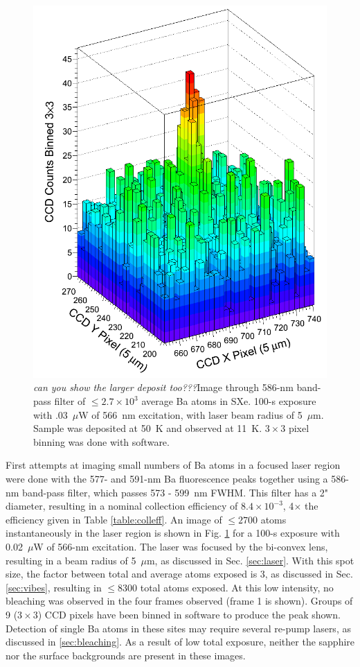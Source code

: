 \begin{figure} %
        \centering
                \includegraphics[width=.6\textwidth]{figures/image_1e4.png}
                \caption{\emph{\color{gray}can you show the larger deposit too???}Image through 586-nm band-pass filter of $\leq 2.7 \times 10^{3}$ average Ba atoms in SXe.  100-s exposure with .03~$\mu$W of 566~nm excitation, with laser beam radius of 5~$\mu$m.  Sample was deposited at 50~K and observed at 11~K.  $3 \times 3$ pixel binning was done with software.}
\label{fig:image590s}
\end{figure}

First attempts at imaging small numbers of Ba atoms in a focused laser region were done with the 577- and 591-nm Ba fluorescence peaks together using a 586-nm band-pass filter, which passes 573 - 599~nm FWHM.  This filter has a 2" diameter, resulting in a nominal collection efficiency of $8.4 \times 10^{-3}$, 4$\times$ the efficiency given in Table \ref{table:colleff}.  An image of $\leq 2700$ atoms instantaneously in the laser region is shown in Fig. \ref{fig:image590s} for a 100-s exposure with 0.02~$\mu$W of 566-nm excitation.  The laser was focused by the bi-convex lens, resulting in a beam radius of 5~$\mu$m, as discussed in Sec. \ref{sec:laser}.  With this spot size, the factor between total and average atoms exposed is 3, as discussed in Sec. \ref{sec:vibes}, resulting in $\leq 8300$ total atoms exposed.  At this low intensity, no bleaching was observed in the four frames observed (frame 1 is shown).  Groups of 9 ($3 \times 3$) CCD pixels have been binned in software to produce the peak shown.  Detection of single Ba atoms in these sites may require several re-pump lasers, as discussed in \ref{sec:bleaching}.  As a result of low total exposure, neither the sapphire nor the surface backgrounds are present in these images. 

